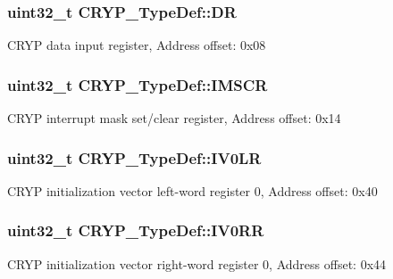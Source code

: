 \subsubsection[{\texorpdfstring{DR}{DR}}]{ uint32\+\_\+t C\+R\+Y\+P\+\_\+\+Type\+Def\+::\+DR}\hypertarget{struct_c_r_y_p___type_def_ab478a4717a3fa209b9c060ecaf70c9a1}{}\label{struct_c_r_y_p___type_def_ab478a4717a3fa209b9c060ecaf70c9a1}
C\+R\+YP data input register, Address offset\+: 0x08 
\subsubsection[{\texorpdfstring{I\+M\+S\+CR}{IMSCR}}]{ uint32\+\_\+t C\+R\+Y\+P\+\_\+\+Type\+Def\+::\+I\+M\+S\+CR}\hypertarget{struct_c_r_y_p___type_def_a3ee13f960f6631c574b1018c97f95925}{}\label{struct_c_r_y_p___type_def_a3ee13f960f6631c574b1018c97f95925}
C\+R\+YP interrupt mask set/clear register, Address offset\+: 0x14 
\subsubsection[{\texorpdfstring{I\+V0\+LR}{IV0LR}}]{ uint32\+\_\+t C\+R\+Y\+P\+\_\+\+Type\+Def\+::\+I\+V0\+LR}\hypertarget{struct_c_r_y_p___type_def_a3b9c6cf4e4ef58624504b08a5fc2242d}{}\label{struct_c_r_y_p___type_def_a3b9c6cf4e4ef58624504b08a5fc2242d}
C\+R\+YP initialization vector left-\/word register 0, Address offset\+: 0x40 
\subsubsection[{\texorpdfstring{I\+V0\+RR}{IV0RR}}]{ uint32\+\_\+t C\+R\+Y\+P\+\_\+\+Type\+Def\+::\+I\+V0\+RR}\hypertarget{struct_c_r_y_p___type_def_a4d6479478d84d3b85dcebb667ad963de}{}\label{struct_c_r_y_p___type_def_a4d6479478d84d3b85dcebb667ad963de}
C\+R\+YP initialization vector right-\/word register 0, Address offset\+: 0x44 
